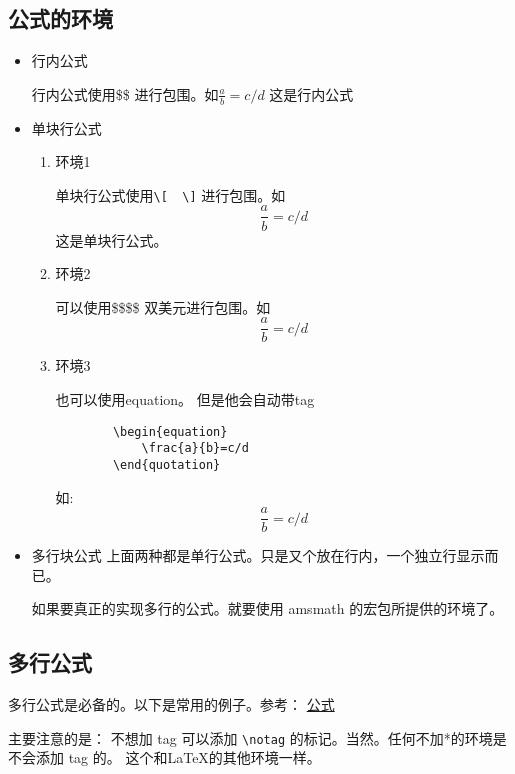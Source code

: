 \documentclass[utf-8,a4paper,11pt]{article}
\begin{document}
\subsection{公式的环境}
\begin{itemize}
    \item 行内公式

          行内公式使用\$\$ 进行包围。如$\frac{a}{b}=c/d$ 这是行内公式

    \item 单块行公式
          \begin{enumerate}
              \item 环境1

                    单块行公式使用\verb!\[  \]! 进行包围。如\[\frac{a}{b}=c/d\] 这是单块行公式。
              \item 环境2

                    可以使用\$\$\quad\$\$ 双美元进行包围。如 $$\frac{a}{b}=c/d$$
              \item 环境3

                    也可以使用equation。 但是他会自动带tag
                    \begin{lstlisting}
        \begin{equation}
            \frac{a}{b}=c/d
        \end{quotation}
    \end{lstlisting}

                    如:
                    \begin{equation}
                        \frac{a}{b}=c/d
                    \end{equation}
          \end{enumerate}
    \item 多行块公式
          上面两种都是单行公式。只是又个放在行内，一个独立行显示而已。

          如果要真正的实现多行的公式。就要使用 amsmath 的宏包所提供的环境了。

\end{itemize}

\subsection{多行公式}

多行公式是必备的。以下是常用的例子。参考： \href{https://matnoble.me/tech/latex/multi-line-equations/}{公式}

主要注意的是： 不想加 tag 可以添加 \verb!\notag! 的标记。当然。任何不加*的环境是不会添加 tag 的。 这个和\LaTeX 的其他环境一样。
\end{document}
